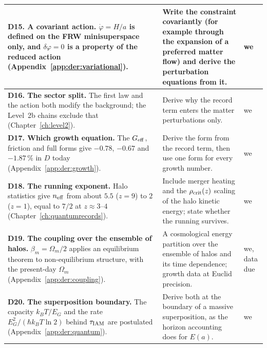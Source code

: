 {\begin{longtable}{@{}>{\raggedright\arraybackslash}p{}>{\raggedright\arraybackslash}p{}>{\raggedright\arraybackslash}p{}@{}}
\textbf{D15. A covariant action.} $\dot\varphi=H/a$ is defined on the FRW minisuperspace only, and $\delta\varphi=0$ is a property of the reduced
 action (Appendix~\ref{app:der:variational}). & Write the constraint covariantly (for example through the expansion of a preferred matter flow) and
 derive the perturbation equations from it. & we \\\cmidrule[0.2pt]{1-3}
\textbf{D16. The sector split.} The first law and the action both modify the background; the Level~2b chains exclude that (Chapter~\ref{ch:level2}).
 & Derive why the record term enters the matter perturbations only. & we \\\cmidrule[0.2pt]{1-3}
\textbf{D17. Which growth equation.} The $G_{\rm eff}$, friction and full forms give $-0.78$, $-0.67$ and $-1.87\,\%$ in $D$ today
 (Appendix~\ref{app:der:growth}). & Derive the form from the record term, then use one form for every growth number. & we \\\cmidrule[0.2pt]{1-3}
\textbf{D18. The running exponent.} Halo statistics give $n_{\rm eff}$ from about $5.5$ ($z=9$) to $2$ ($z=1$), equal to $7/2$ at $z\approx3$--$4$
 (Chapter~\ref{ch:quantumrecords}). & Include merger heating and the $\rho_{\rm crit}(z)$ scaling of the halo kinetic energy; state whether the running
 survives. & we \\\cmidrule[0.2pt]{1-3}
\textbf{D19. The coupling over the ensemble of halos.} $\beta_m=\Omega_m/2$ applies an equilibrium theorem to non-equilibrium structure, with the
 present-day $\Omega_m$ (Appendix~\ref{app:der:coupling}). & A cosmological energy partition over the ensemble of halos and its time dependence;
 growth data at Euclid precision. & we, data due \\\cmidrule[0.2pt]{1-3}
\textbf{D20. The superposition boundary.} The capacity $k_BT/E_G$ and the rate $E_G^2/(\hbar k_BT\ln2)$ behind $\tau_{\rm IAM}$ are postulated
 (Appendix~\ref{app:der:quantum}). & Derive both at the boundary of a massive superposition, as the horizon accounting does for $E(a)$. & we \\
\bottomrule
\end{longtable}}

